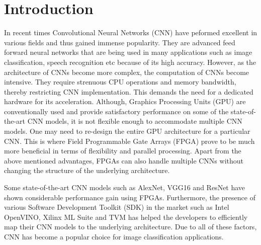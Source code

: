 \chapter{Introduction}
In recent times Convolutional Neural Networks (CNN) have peformed excellent in various fields and thus gained immense popularity. They are advanced feed forward neural networks that are being used in many applications such as image classification, speech recognition etc because of its high accuracy. However, as the architecture of CNNs become more complex, the computation of CNNs become intensive. They require strenuous CPU operations and memory bandwidth, thereby restricting CNN implementation. This demands the need for a dedicated
hardware for its acceleration. Although, Graphics Processing Units (GPU) are conventionally used and provide satisfactory performance on some of the state-of-the-art CNN models, it is not flexible enough to accommodate multiple CNN models. One may need to re-design the entire GPU architecture for a particular CNN. This is where Field Programmable
Gate Arrays (FPGA) prove to be much more beneficial in terms of flexibility
and parallel processing. Apart from the above mentioned advantages, FPGAs can also handle multiple CNNs without changing the structure of the underlying architecture. 

Some state-of-the-art CNN models such as AlexNet,
VGG16 and ResNet have shown considerable performance gain using FPGAs.
Furthermore, the presence of various Software Development Toolkit (SDK)
in the market such as Intel OpenVINO, Xilinx ML Suite and TVM has helped
the developers to efficiently map their CNN models to the underlying architecture. Due to all of these factors, CNN has become a popular choice for image
classification applications.


